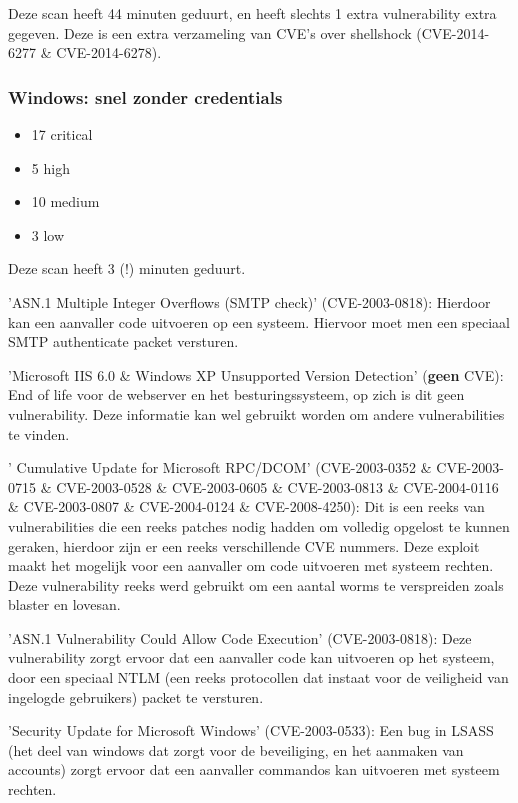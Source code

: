 Deze scan heeft  44 minuten geduurt, en heeft slechts 1 extra vulnerability extra gegeven. Deze is een extra verzameling van CVE's over shellshock (CVE-2014-6277 \& CVE-2014-6278).

\subsubsection{Windows: snel zonder credentials}

\begin{itemize}
\item 17 critical
\item 5 high
\item 10 medium
\item 3 low
\end{itemize}

Deze scan heeft 3 (!) minuten geduurt.

'ASN.1 Multiple Integer Overflows (SMTP check)' (CVE-2003-0818): Hierdoor kan een aanvaller code uitvoeren op een systeem. Hiervoor moet men een speciaal SMTP authenticate packet versturen.

'Microsoft IIS 6.0 \& Windows XP Unsupported Version Detection' (\textbf{geen} CVE): End of life voor de webserver en het besturingssysteem, op zich is dit geen vulnerability. Deze informatie kan wel gebruikt worden om andere vulnerabilities te vinden.

' Cumulative Update for Microsoft RPC/DCOM' (CVE-2003-0352 \& CVE-2003-0715 \& CVE-2003-0528 \& CVE-2003-0605 \& CVE-2003-0813 \& CVE-2004-0116 \& CVE-2003-0807 \& CVE-2004-0124 \& CVE-2008-4250): Dit is een reeks van vulnerabilities die een reeks patches nodig hadden om volledig opgelost te kunnen geraken, hierdoor zijn er een reeks verschillende CVE nummers. Deze exploit maakt het mogelijk voor een aanvaller om code uitvoeren met systeem rechten. Deze vulnerability reeks werd gebruikt om een aantal worms te verspreiden zoals blaster en lovesan.

'ASN.1 Vulnerability Could Allow Code Execution' (CVE-2003-0818): Deze vulnerability zorgt ervoor dat een aanvaller code kan uitvoeren op het systeem, door een speciaal NTLM (een reeks protocollen dat instaat voor de veiligheid van ingelogde gebruikers) packet te versturen.

'Security Update for Microsoft Windows' (CVE-2003-0533): Een bug in LSASS (het deel van windows dat zorgt voor de beveiliging, en het aanmaken van accounts) zorgt ervoor dat een aanvaller commandos kan uitvoeren met systeem rechten.

